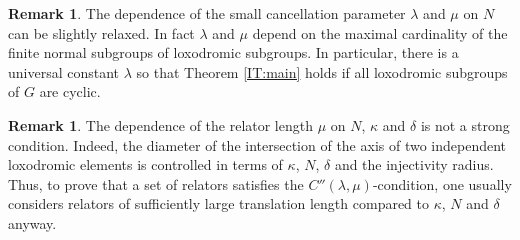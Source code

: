 \documentclass[leqno,a4paper,10pt]{amsart}
\theoremstyle{plain}
\theoremstyle{definition}
\newtheorem{rem}[thm]{Remark}
\theoremstyle{remark}
\begin{document}



\begin{rem} The dependence of the small cancellation parameter $\lambda$ and $\mu$ on $N$ can be slightly relaxed. In fact $\lambda$ and $\mu$ depend on the maximal cardinality of the finite normal subgroups of loxodromic subgroups. In particular, there is a universal constant $\lambda$ so that Theorem \ref{IT:main} holds if all loxodromic subgroups of $G$ are cyclic.
\end{rem}

\begin{rem} The dependence of the relator length $\mu$ on $N$, $\kappa$ and $\delta$ is not a strong condition. Indeed, the diameter of the intersection of the axis of two independent loxodromic elements is controlled in terms of $\kappa$, $N$, $\delta$ and the injectivity radius. Thus, to prove that a set of relators satisfies the  $C''(\lambda,\mu)$-condition, one usually considers relators of sufficiently large translation length compared to $\kappa$, $N$ and $\delta$ anyway. 
\end{rem}
\end{document}
